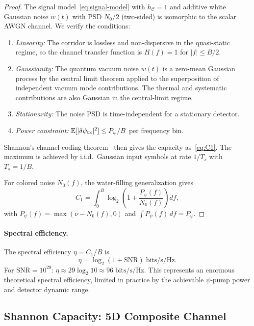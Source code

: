 \documentclass[twocolumn,superscriptaddress,prd,nofootinbib]{revtex4-2}
\newcommand{\SNR}{\mathrm{SNR}}
\newcommand{\Corridor}{\mathcal{C}}
\begin{document}
\begin{proof}
The signal model~\eqref{eq:signal-model} with $h_\Corridor = 1$ and
additive white Gaussian noise $w(t)$ with PSD $N_0/2$ (two-sided) is
isomorphic to the scalar AWGN channel. We verify the conditions:
\begin{enumerate}
\item \emph{Linearity:} The corridor is lossless and non-dispersive in
the quasi-static regime, so the channel transfer function is
$H(f) = 1$ for $|f| \leq B/2$.
\item \emph{Gaussianity:} The quantum vacuum noise $w(t)$ is a
zero-mean Gaussian process by the central limit theorem applied to
the superposition of independent vacuum mode contributions.
The thermal and systematic contributions are also Gaussian in the
central-limit regime.
\item \emph{Stationarity:} The noise PSD is time-independent for a
stationary detector.
\item \emph{Power constraint:}
$\mathbb{E}[|\delta\psi_{\rm tx}|^2] \leq P_\psi/B$ per frequency bin.
\end{enumerate}
Shannon's channel coding theorem~\cite{Shannon1948,CoverThomas2006}
then gives the capacity as~\eqref{eq:C1}. The maximum is achieved by
i.i.d.\ Gaussian input symbols at rate $1/T_s$ with $T_s = 1/B$.

For colored noise $N_0(f)$, the water-filling generalization gives
\begin{equation}
C_1 = \int_0^B \log_2\!\left(1 + \frac{P_\psi(f)}{N_0(f)}\right)df,
\end{equation}
with $P_\psi(f) = \max(\nu - N_0(f), 0)$ and $\int P_\psi(f)\,df = P_\psi$.
\end{proof}

\paragraph{Spectral efficiency.}
The spectral efficiency $\eta = C_1/B$ is
\begin{equation}
\eta = \log_2(1 + \SNR)\;\text{bits/s/Hz}.
\end{equation}
For $\SNR = 10^{29}$:
$\eta \approx 29\log_2 10 \approx 96\;\text{bits/s/Hz}$.
This represents an enormous theoretical spectral efficiency, limited
in practice by the achievable $\psi$-pump power and detector dynamic range.

\subsection{Shannon Capacity: 5D Composite Channel}
\end{document}
